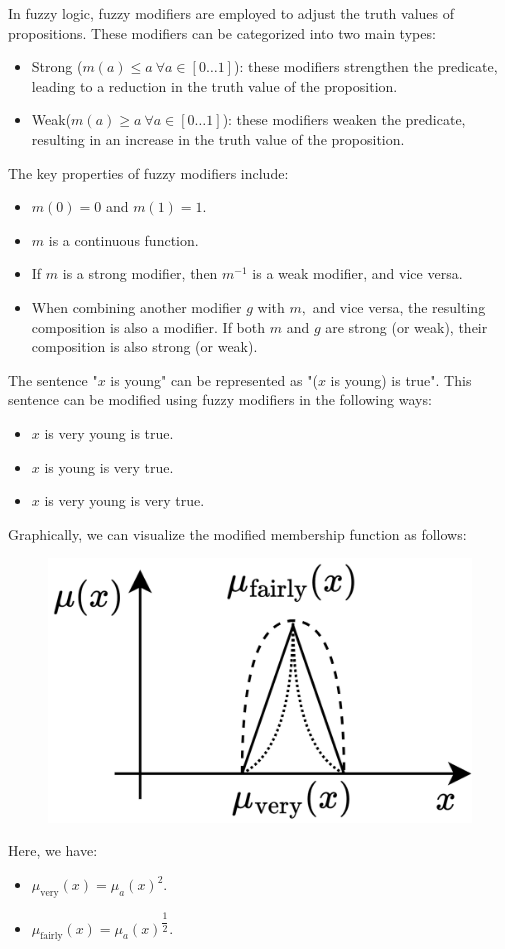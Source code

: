 In fuzzy logic, fuzzy modifiers are employed to adjust the truth values of propositions. These modifiers can be categorized into two main types:
\begin{itemize}
    \item Strong ($m(a) \leq a \: \forall a \in [0 \dots 1]$): these modifiers strengthen the predicate, leading to a reduction in the truth value of the proposition.
    \item Weak($m(a) \geq a \: \forall a \in [0 \dots 1]$): these modifiers weaken the predicate, resulting in an increase in the truth value of the proposition.
\end{itemize}
The key properties of fuzzy modifiers include:
\begin{itemize}
    \item $m(0)=0$ and $m(1)=1$.
    \item $m$ is a continuous function. 
    \item If $m$ is a strong modifier, then $m^{-1}$ is a weak modifier, and vice versa.
    \item When combining another modifier $g$ with $m,$ and vice versa, the resulting composition is also a modifier. 
        If both $m$ and $g$ are strong (or weak), their composition is also strong (or weak).
\end{itemize}
\begin{example}
    The sentence "$x$ is young" can be represented as "($x$ is young) is true". This sentence can be modified using fuzzy modifiers in the following ways:
    \begin{itemize}
        \item $x$ is very young is true.
        \item $x$ is young is very true.
        \item $x$ is very young is very true.
    \end{itemize}
    Graphically, we can visualize the modified membership function as follows:
    \begin{figure}[H]
        \centering
        \includegraphics[width=0.3\linewidth]{images/modifiers.png}
    \end{figure}
    Here, we have:
    \begin{itemize}
        \item $\mu_{\text{very}}(x)=\mu_a(x)^2$.
        \item $\mu_{\text{fairly}}(x)=\mu_a(x)^{\dfrac{1}{2}}$.
    \end{itemize}
\end{example}